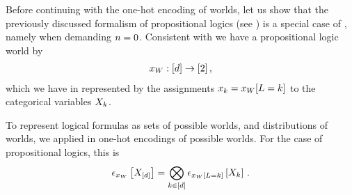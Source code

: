 
%
Before continuing with the one-hot encoding of \firstOrderLogic{} worlds, let us show that the previously discussed formalism of propositional logics (see ) is a special case of \firstOrderLogic{}, namely when demanding $n=0$.
Consistent with  we have a propositional logic world by
\begin{align*}
    x_{W}: [d] \rightarrow [2] \, ,
\end{align*}
which we have in  represented by the assignments $x_{k} = x_{W}[L=k]$ to the categorical variables $X_{k}$.


To represent logical formulas as sets of possible worlds, and distributions of worlds, we applied in  one-hot encodings of possible worlds.
For the case of propositional logics, this is
\begin{align*}
    \epsilon_{x_{W}}\left[X_{[d]}\right] = \bigotimes_{k\in[d]} \epsilon_{x_{W}[L=k]}\left[X_{k}\right] \, .
\end{align*}


